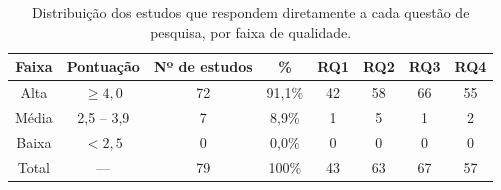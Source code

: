 \begin{table}[H]
\centering
\begin{tabular}{|c|c|c|c|c|c|c|c|}
\hline
Faixa & Pontuação & Nº de estudos & \% & RQ1 & RQ2 & RQ3 & RQ4 \\
\hline
Alta  & $\geq 4{,}0$ & 72 & 91,1\% & 42 & 58 & 66 & 55 \\
\hline
Média & 2,5 -- 3,9   & 7  & 8,9\%  & 1  & 5  & 1  & 2  \\
\hline
Baixa & $< 2{,}5$    & 0  & 0,0\%  & 0  & 0  & 0  & 0  \\
\hline
Total & ---          & 79 & 100\%  & 43 & 63 & 67 & 57 \\
\hline
\end{tabular}
\caption{Distribuição dos estudos que respondem diretamente a cada questão de pesquisa, por faixa de qualidade.}
\label{tab:qualidade}
\end{table}